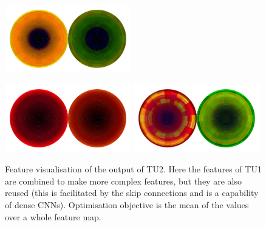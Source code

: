 \begin{figure}[h!]
\begin{center}
        \includegraphics[width=0.49\textwidth]{figures/appendix_featurevis/TU2_6.pdf}
    \end{center}
    \begin{center}
        \includegraphics[width=0.49\textwidth]{figures/appendix_featurevis/TU2_0.pdf}
        \includegraphics[width=0.49\textwidth]{figures/appendix_featurevis/TU2_41.pdf}
    \end{center}
    \caption{Feature visualisation of the output of TU2. Here the features of TU1 are combined to make more complex features, 
    but they are also reused (this is facilitated by the skip connections and is a capability of dense CNNs).
    Optimisation objective is the mean of the values over a whole feature map.}
\end{figure}

